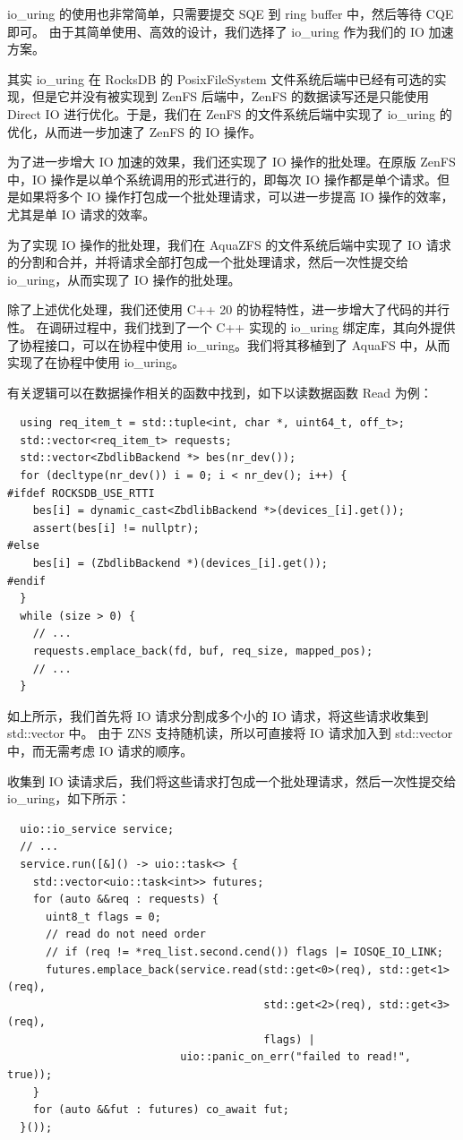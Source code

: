 io\_uring 的使用也非常简单，只需要提交 SQE 到 ring buffer 中，然后等待 CQE 即可。
由于其简单使用、高效的设计，我们选择了 io\_uring 作为我们的 IO 加速方案。

其实 io\_uring 在 RocksDB 的 PosixFileSystem 文件系统后端中已经有可选的实现，但是它并没有被实现到 ZenFS 后端中，ZenFS 的数据读写还是只能使用 Direct IO 进行优化。于是，我们在 ZenFS 的文件系统后端中实现了 io\_uring 的优化，从而进一步加速了 ZenFS 的 IO 操作。

为了进一步增大 IO 加速的效果，我们还实现了 IO 操作的批处理。在原版 ZenFS 中，IO 操作是以单个系统调用的形式进行的，即每次 IO 操作都是单个请求。但是如果将多个 IO 操作打包成一个批处理请求，可以进一步提高 IO 操作的效率，尤其是单 IO 请求的效率。

为了实现 IO 操作的批处理，我们在 AquaZFS 的文件系统后端中实现了 IO 请求的分割和合并，并将请求全部打包成一个批处理请求，然后一次性提交给 io\_uring，从而实现了 IO 操作的批处理。

除了上述优化处理，我们还使用 C++ 20 的协程特性，进一步增大了代码的并行性。
在调研过程中，我们找到了一个 C++ 实现的 io\_uring 绑定库，其向外提供了协程接口，可以在协程中使用 io\_uring。我们将其移植到了 AquaFS 中，从而实现了在协程中使用 io\_uring。

有关逻辑可以在数据操作相关的函数中找到，如下以读数据函数 Read 为例：

\begin{lstlisting}
  using req_item_t = std::tuple<int, char *, uint64_t, off_t>;
  std::vector<req_item_t> requests;
  std::vector<ZbdlibBackend *> bes(nr_dev());
  for (decltype(nr_dev()) i = 0; i < nr_dev(); i++) {
#ifdef ROCKSDB_USE_RTTI
    bes[i] = dynamic_cast<ZbdlibBackend *>(devices_[i].get());
    assert(bes[i] != nullptr);
#else
    bes[i] = (ZbdlibBackend *)(devices_[i].get());
#endif
  }
  while (size > 0) {
    // ...
    requests.emplace_back(fd, buf, req_size, mapped_pos);
    // ...
  }
\end{lstlisting}

如上所示，我们首先将 IO 请求分割成多个小的 IO 请求，将这些请求收集到 std::vector 中。
由于 ZNS 支持随机读，所以可直接将 IO 请求加入到 std::vector 中，而无需考虑 IO 请求的顺序。

收集到 IO 读请求后，我们将这些请求打包成一个批处理请求，然后一次性提交给 io\_uring，如下所示：

\begin{lstlisting}
  uio::io_service service;
  // ...
  service.run([&]() -> uio::task<> {
    std::vector<uio::task<int>> futures;
    for (auto &&req : requests) {
      uint8_t flags = 0;
      // read do not need order
      // if (req != *req_list.second.cend()) flags |= IOSQE_IO_LINK;
      futures.emplace_back(service.read(std::get<0>(req), std::get<1>(req),
                                        std::get<2>(req), std::get<3>(req),
                                        flags) |
                           uio::panic_on_err("failed to read!", true));
    }
    for (auto &&fut : futures) co_await fut;
  }());
\end{lstlisting}

